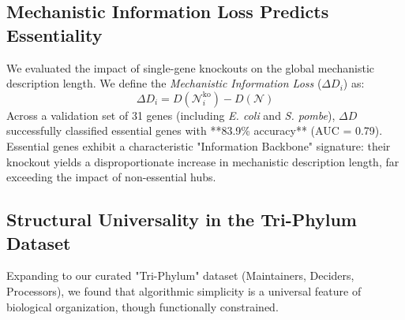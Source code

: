 \documentclass{article}
\begin{document}
\subsection{Mechanistic Information Loss Predicts Essentiality}
We evaluated the impact of single-gene knockouts on the global mechanistic description length. We define the \textit{Mechanistic Information Loss} ($\Delta D_i$) as:
\begin{equation}
\Delta D_i = D(\mathcal{N}_i^{\mathrm{ko}}) - D(\mathcal{N})
\end{equation}
Across a validation set of 31 genes (including \textit{E. coli} and \textit{S. pombe}), $\Delta D$ successfully classified essential genes with **83.9\% accuracy** (AUC = 0.79). Essential genes exhibit a characteristic "Information Backbone" signature: their knockout yields a disproportionate increase in mechanistic description length, far exceeding the impact of non-essential hubs.

\subsection{Structural Universality in the Tri-Phylum Dataset}
Expanding to our curated "Tri-Phylum" dataset (Maintainers, Deciders, Processors), we found that algorithmic simplicity is a universal feature of biological organization, though functionally constrained.

\begin{table}[h]
\centering
\caption{Algorithmic Universality Results ($D_{v2}$ vs Null Models)}
\label{tab:universality}
\end{table}
\end{document}
